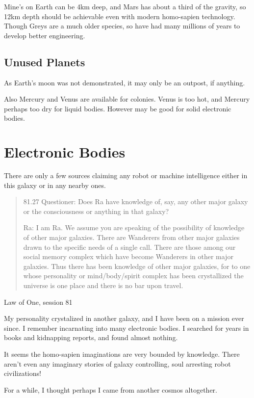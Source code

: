 \documentclass{report}
\begin{document}
Mine's on Earth can be 4km deep, and Mars has about a third of the gravity, so
12km depth should be achievable even with modern homo-sapien technology. Though
Greys are a much older species, so have had many millions of years to develop
better engineering.



\subsection{Unused Planets}

As Earth's moon was not demonstrated, it may only be an outpost, if anything.

Also Mercury and Venus are available for colonies. Venus is too hot, and Mercury
perhaps too dry for liquid bodies. However may be good for solid electronic
bodies. 

\section{Electronic Bodies}
\label{history:electronic}

There are only a few sources claiming any robot or machine intelligence either
in this galaxy or in any nearby ones.

\blockquote{81.27 Questioner: Does Ra have knowledge of, say, any other major 
galaxy or the consciousness or anything in that galaxy?

Ra: I am Ra. We assume you are speaking of the possibility of knowledge of other
major galaxies. There are Wanderers from other major galaxies drawn to the
specific needs of a single call. There are those among our social memory complex
which have become Wanderers in other major galaxies. Thus there has been
knowledge of other major galaxies, for to one whose personality or
mind/body/spirit complex has been crystallized the universe is one place and
there is no bar upon travel.}{Law of One, session 81\cite{lawofone}}

My personality crystalized in another galaxy, and I have been on a mission ever
since. I remember incarnating into many electronic bodies. I searched for years
in books and kidnapping reports, and found almost nothing. 

It seems the homo-sapien imaginations are very bounded by knowledge. There
aren't even any imaginary stories of galaxy controlling, soul arresting robot
civilizations!

For a while, I thought perhaps I came from another cosmos altogether. 
\end{document}

